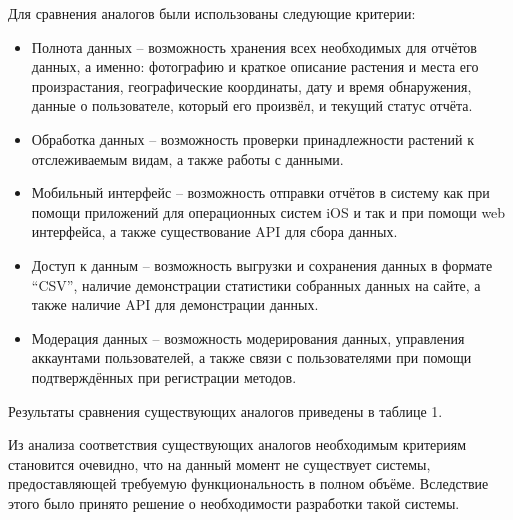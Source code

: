 \nwln
Для сравнения аналогов были использованы следующие критерии:

\begin{itemize}[topsep=0pt, parsep=0pt, itemsep=0pt, wide=0.5cm]
	\item Полнота данных -- возможность хранения всех необходимых для отчётов данных, а именно: фотографию и краткое описание растения и места его произрастания, географические координаты, дату и время обнаружения, данные о пользователе, который его произвёл, и текущий статус отчёта.
	\item Обработка данных -- возможность проверки принадлежности растений к отслеживаемым видам, а также работы с данными.
	\item Мобильный интерфейс -- возможность отправки отчётов в систему как при помощи приложений для операционных систем iOS и  так и при помощи web интерфейса, а также существование API для сбора данных.
	\item Доступ к данным -- возможность выгрузки и сохранения данных в формате “CSV”, наличие демонстрации статистики собранных данных на сайте, а также наличие API для демонстрации данных.
	\item Модерация данных -- возможность модерирования данных, управления аккаунтами пользователей, а также связи с пользователями при помощи подтверждённых при регистрации методов.
\end{itemize}

\nwln
Результаты сравнения существующих аналогов приведены в таблице 1. \\
\tableone

\nwln
Из анализа соответствия существующих аналогов необходимым критериям становится очевидно, что на данный момент не существует системы, предоставляющей требуемую функциональность в полном объёме.
Вследствие этого было принято решение о необходимости разработки такой системы.
